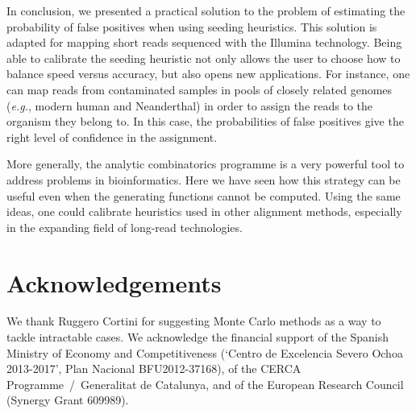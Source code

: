 \documentclass{article}
\begin{document}
In conclusion, we presented a practical solution to the problem of
estimating the probability of false positives when using seeding
heuristics. This solution is adapted for mapping short reads sequenced
with the Illumina technology. Being able to calibrate the seeding
heuristic not only allows the user to choose how to balance speed versus
accuracy, but also opens new applications. For instance, one can map reads
from contaminated samples in pools of closely related genomes
(\textit{e.g.}, modern human and Neanderthal) in order to assign the reads
to the organism they belong to. In this case, the probabilities of false
positives give the right level of confidence in the assignment.

More generally, the analytic combinatorics programme is a very powerful
tool to address problems in bioinformatics. Here we have seen how this
strategy can be useful even when the generating functions cannot be
computed. Using the same ideas, one could calibrate heuristics used in
other alignment methods, especially in the expanding field of long-read
technologies.


\section*{Acknowledgements}

We thank Ruggero Cortini for suggesting Monte Carlo methods as a way to
tackle intractable cases. We acknowledge the financial support of the
Spanish Ministry of Economy and Competitiveness (‘Centro de Excelencia
Severo Ochoa 2013-2017’, Plan Nacional BFU2012-37168), of the CERCA
Programme~/~Generalitat de Catalunya, and of the European Research Council
(Synergy Grant 609989).






\end{document}
